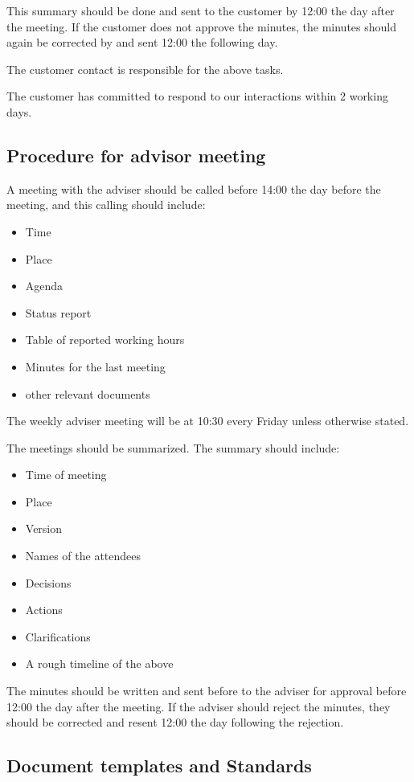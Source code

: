 This summary should be done and sent to the customer by 12:00 the day after the meeting. If the customer does not approve the minutes, the minutes should again be corrected by and sent 12:00 the following day.

The customer contact is responsible for the above tasks.

The customer has committed to respond to our interactions within 2 working days.

\subsection{Procedure for advisor meeting}
A meeting with the adviser should be called before 14:00 the day before the meeting, and this calling should include:
\begin{itemize}
	\item Time
	\item Place
	\item Agenda
	\item Status report
	\item Table of reported working hours
	\item Minutes for the last meeting
	\item other relevant documents
\end{itemize}
The weekly adviser meeting will be at 10:30 every Friday unless otherwise stated.

The meetings should be summarized. The summary should include:
\begin{itemize}
	\item Time of meeting
	\item Place
	\item Version
	\item Names of the attendees
	\item Decisions
	\item Actions
	\item Clarifications
	\item A rough timeline of the above
\end{itemize}
The minutes should be written and sent before to the adviser for approval before 12:00 the day after the meeting. If the adviser should reject the minutes, they should be corrected and resent 12:00 the day following the rejection.

\subsection{Document templates and Standards}

